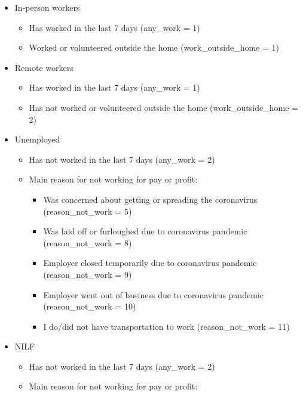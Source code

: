 \documentclass[
]{article}
\providecommand{\tightlist}{%
  \setlength{\itemsep}{0pt}\setlength{\parskip}{0pt}}
\begin{document}
\begin{itemize}
\tightlist
\item
  In-person workers

  \begin{itemize}
  \tightlist
  \item
    Has worked in the last 7 days (any\_work = 1)
  \item
    Worked or volunteered outside the home (work\_outside\_home = 1)
  \end{itemize}
\item
  Remote workers

  \begin{itemize}
  \tightlist
  \item
    Has worked in the last 7 days (any\_work = 1)
  \item
    Has not worked or volunteered outside the home (work\_outside\_home
    = 2)
  \end{itemize}
\item
  Unemployed

  \begin{itemize}
  \tightlist
  \item
    Has not worked in the last 7 days (any\_work = 2)
  \item
    Main reason for not working for pay or profit:

    \begin{itemize}
    \tightlist
    \item
      Was concerned about getting or spreading the coronavirus
      (reason\_not\_work = 5)
    \item
      Was laid off or furloughed due to coronavirus pandemic
      (reason\_not\_work = 8)
    \item
      Employer closed temporarily due to coronavirus pandemic
      (reason\_not\_work = 9)
    \item
      Employer went out of business due to coronavirus pandemic
      (reason\_not\_work = 10)
    \item
      I do/did not have transportation to work (reason\_not\_work = 11)
    \end{itemize}
  \end{itemize}
\item
  NILF

  \begin{itemize}
  \tightlist
  \item
    Has not worked in the last 7 days (any\_work = 2)
  \item
    Main reason for not working for pay or profit:


\end{itemize}
\end{itemize}
\end{document}
